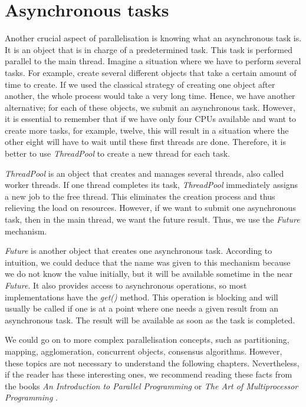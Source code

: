 \section{Asynchronous tasks}
\label{04:asynctaks}

Another crucial aspect of parallelisation is knowing what an asynchronous task is.
It is an object that is in charge of a predetermined task.
This task is performed parallel to the main thread.
Imagine a situation where we have to perform several tasks.
For example, create several different objects that take a certain amount of time to create.
If we used the classical strategy of creating one object after another, the whole process would take a very long time.
Hence, we have another alternative;
for each of these objects, we submit an asynchronous task.
However, it is essential to remember that if we have only four CPUs available and want to create more tasks, for example, twelve, this will result in a situation where the other eight will have to wait until these first threads are done.
Therefore, it is better to use \emph{ThreadPool} to create a new thread for each task.

\emph{ThreadPool} is an object that creates and manages several threads, also called worker threads.
If one thread completes its task, \emph{ThreadPool} immediately assigns a new job to the free thread.
 This eliminates the creation process and thus relieving the load on resources.
 However, if we want to submit one asynchronous task, then in the main thread, we want the future result.
 Thus, we use the \emph{Future} mechanism.

\emph{Future} is another object that creates one asynchronous task.
According to intuition, we could deduce that the name was given to this mechanism because we do not know the value initially, but it will be available sometime in the near \emph{Future}.
It also provides access to asynchronous operations, so most implementations have the \emph{get()} method.
This operation is blocking and will usually be called if one is at a point where one needs a given result from an asynchronous task.
The result will be available as soon as the task is completed.

We could go on to more complex parallelisation concepts, such as partitioning, mapping, agglomeration, concurrent objects, consensus algorithms.
However, these topics are not necessary to understand the following chapters.
Nevertheless, if the reader has these interesting ones, we recommend reading these facts from the books \emph{An Introduction to Parallel Programming} \cite{introductionToParallelProgramming} or \emph{The Art of Multiprocessor Programming} \cite{artOfMultiprocessorProgramming}.
